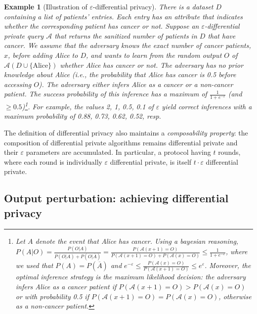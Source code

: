 \documentclass[11pt,a4paper]{article}
\theoremstyle{plain}
\theoremstyle{plain}
\theoremstyle{plain}
\newtheorem{example}{Example}
\theoremstyle{plain}
\theoremstyle{nonumberplain} \theoremseparator{}
\begin{document}
\begin{example}[Illustration of $\varepsilon$-differential privacy]
There is a dataset $D$ containing a list of patients' entries. Each entry has an attribute that indicates whether the corresponding patient has cancer or not. Suppose an $\varepsilon$-differential private query $\mathcal{A}$ that returns the sanitized number of patients in $D$ that have cancer. We assume that the adversary knows the exact number of cancer patients, $x$, before adding Alice to $D$, and wants to learn from the  random output $O$ of $\mathcal{A}(D\cup\{\text{Alice}\})$ whether Alice has cancer or not. The adversary has no prior knowledge about Alice (i.e., the probability that Alice has cancer is 0.5 before accessing $O$). The adversary either infers Alice as a cancer or a non-cancer patient.   
The success probability of this inference has a maximum of $\frac{1}{1+e^{-\varepsilon}}$ (and $\geq 0.5$)\footnote{Let $A$ denote the event that Alice has cancer. Using a bayesian reasoning, $P(A|O) = \frac{P(O|A)}{P(O|A)+P(O|\overline{A})} = \frac{P(\mathcal{A}(x+1)=O)}{P(\mathcal{A}(x+1)=O)+ P(\mathcal{A}(x)=O)} \leq \frac{1}{1+e^{-\varepsilon}}$, where we used that $P(A)=P(\overline{A})$ and  $e^{-\varepsilon} \leq \frac{P(\mathcal{A}(x)=O)}{P(\mathcal{A}(x+1)=O)} \leq e^\varepsilon$. Moreover, the optimal inference strategy is the maximum likelihood decision: the adversary infers Alice as a cancer patient if $P(\mathcal{A}(x+1) = O) > P(\mathcal{A}(x) = O)$ or with probability 0.5 if $P(\mathcal{A}(x+1) = O) = P(\mathcal{A}(x) = O)$, otherwise as a non-cancer patient.}. For example, the values 2, 1, 0.5, 0.1 of $\varepsilon$ yield correct inferences with a maximum probability of 0.88, 0.73, 0.62, 0.52, resp.   
\end{example}

The definition of differential privacy also maintains a \emph{composability property}: the composition of differential private algorithms remains differential private and their $\varepsilon$ parameters are accumulated. In particular, a protocol having $t$ rounds, where each round is individually $\varepsilon$ differential private, is itself $t\cdot\varepsilon$ differential private.





\subsection{Output perturbation: achieving differential privacy}
\label{sec:perturbation}
\end{document}
